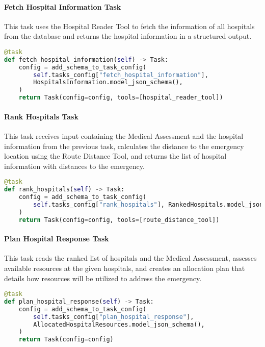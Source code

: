 \paragraph{Fetch Hospital Information Task}
This task uses the Hospital Reader Tool to fetch the information of all hospitals from the database and returns the hospital information in a structured output.

\begin{lstlisting}[language=Python]
@task
def fetch_hospital_information(self) -> Task:
    config = add_schema_to_task_config(
        self.tasks_config["fetch_hospital_information"],
        HospitalsInformation.model_json_schema(),
    )
    return Task(config=config, tools=[hospital_reader_tool])
\end{lstlisting}

\paragraph{Rank Hospitals Task}
This task receives input containing the Medical Assessment and the hospital information from the previous task, calculates the distance to the emergency location using the Route Distance Tool, and returns the list of hospital information with distances to the emergency.

\begin{lstlisting}[language=Python]
@task
def rank_hospitals(self) -> Task:
    config = add_schema_to_task_config(
        self.tasks_config["rank_hospitals"], RankedHospitals.model_json_schema()
    )
    return Task(config=config, tools=[route_distance_tool])
\end{lstlisting}

\paragraph{Plan Hospital Response Task}
This task reads the ranked list of hospitals and the Medical Assessment, assesses available resources at the given hospitals, and creates an allocation plan that details how resources will be utilized to address the emergency.

\begin{lstlisting}[language=Python]
@task
def plan_hospital_response(self) -> Task:
    config = add_schema_to_task_config(
        self.tasks_config["plan_hospital_response"],
        AllocatedHospitalResources.model_json_schema(),
    )
    return Task(config=config)
\end{lstlisting}

